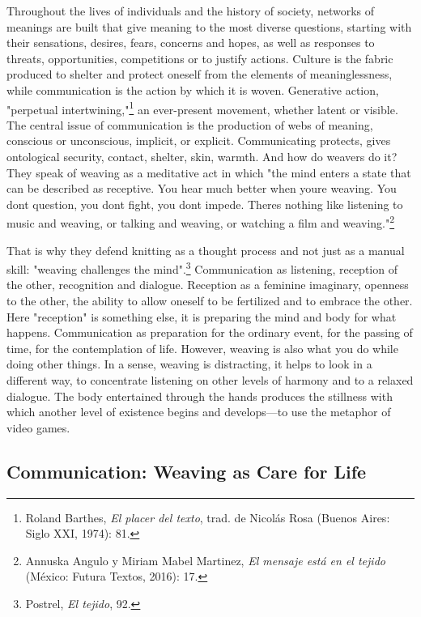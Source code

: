 \documentclass{tufte-handout}
\begin{document}
Throughout the lives of individuals and the history of society, networks
of meanings are built that give meaning to the most diverse questions,
starting with their sensations, desires, fears, concerns and hopes, as
well as responses to threats, opportunities, competitions or to justify
actions. Culture is the fabric produced to shelter and protect oneself
from the elements of meaninglessness, while communication is the action
by which it is woven. Generative action, "perpetual
intertwining,"\footnote{Roland Barthes, \emph{El placer del texto},
  trad. de Nicolás Rosa (Buenos Aires: Siglo XXI, 1974): 81.} an
ever-present movement, whether latent or visible. The central issue of
communication is the production of webs of meaning, conscious or
unconscious, implicit, or explicit. Communicating protects, gives
ontological security, contact, shelter, skin, warmth. And how do weavers
do it? They speak of weaving as a meditative act in which "the mind
enters a state that can be described as
\textquotesingle receptive.\textquotesingle{} You hear much better when
you\textquotesingle re weaving. You don\textquotesingle t question, you
don\textquotesingle t fight, you don\textquotesingle t impede.
There\textquotesingle s nothing like listening to music and weaving, or
talking and weaving, or watching a film and weaving."\footnote{Annuska
  Angulo y Miriam Mabel Martinez, \emph{El mensaje está en el tejido}
  (México: Futura Textos, 2016): 17.}

That is why they defend knitting as a thought process and not just as a
manual skill: "weaving challenges the mind".\footnote{Postrel, \emph{El
  tejido}, 92.} Communication as listening, reception of the other,
recognition and dialogue. Reception as a feminine imaginary, openness to
the other, the ability to allow oneself to be fertilized and to embrace
the other. Here "reception" is something else, it is preparing the mind
and body for what happens. Communication as preparation for the ordinary
event, for the passing of time, for the contemplation of life. However,
weaving is also what you do while doing other things. In a sense,
weaving is distracting, it helps to look in a different way, to
concentrate listening on other levels of harmony and to a relaxed
dialogue. The body entertained through the hands produces the stillness
with which another level of existence begins and develops---to use the
metaphor of video games.

\hypertarget{communication-weaving-as-care-for-life}{%
\subsection{Communication: Weaving as Care for
Life}\label{communication-weaving-as-care-for-life}}
\end{document}
